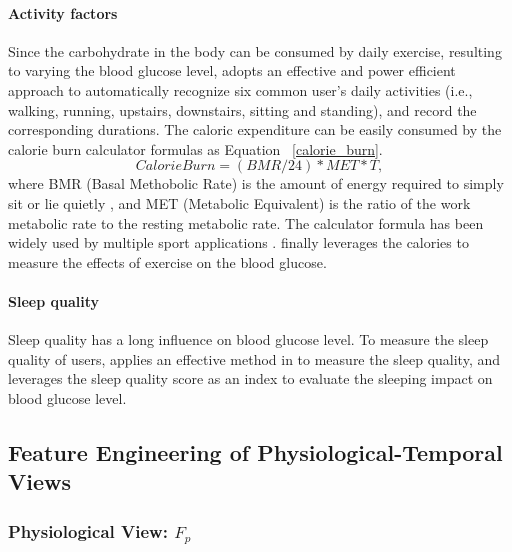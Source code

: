 \paragraph{Activity factors}
Since the carbohydrate in the body can be consumed by daily exercise, resulting to varying the blood glucose level, \sysname adopts an effective and power efficient approach \cite{bib:kwapisz2011activity} to automatically recognize six common user's daily activities (i.e., walking, running, upstairs, downstairs, sitting and standing), and record the corresponding durations. The caloric expenditure can be easily consumed by the calorie burn calculator formulas as Equation ~\ref{calorie_burn}.
\begin{equation}\label{calorie_burn}
  Calorie Burn = (BMR/24)*MET*T,
\end{equation}
where BMR (Basal Methobolic Rate) is the amount of energy required to simply sit or lie quietly \cite{bib:mcnab1997utility}, and MET (Metabolic Equivalent) is the ratio of the work metabolic rate to the resting metabolic rate\cite{bib:ainsworth2000compendium}. The calculator formula has been widely used by multiple sport applications \cite{bib:shapesense, bib:HealthStatus, bib:CalorieCounter}.
\sysname finally leverages the calories to measure the effects of exercise on the blood glucose.

\paragraph{Sleep quality}
Sleep quality has a long influence on blood glucose level. To measure the sleep quality of users, \sysname applies an effective method in \cite{bib:gu2014intelligent} to measure the sleep quality, and leverages the sleep quality score as an index to evaluate the sleeping impact on blood glucose level.

\subsection{Feature Engineering of Physiological-Temporal Views }
\subsubsection{Physiological View: $F_p$}

